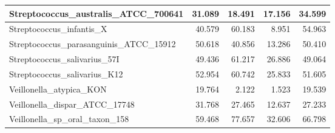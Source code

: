 \documentclass[12pt,a4paper]{article}
\begin{document}
\begin{table}[ht]
\begin{center}
\begin{tabular}{|l*{4}{|r}|}
Streptococcus\_australis\_ATCC\_700641 & 31.089 & 18.491 & 17.156 & 34.599 \\ \hline
Streptococcus\_infantis\_X & 40.579 & 60.183 & 8.951 & 54.963 \\ \hline
Streptococcus\_parasanguinis\_ATCC\_15912 & 50.618 & 40.856 & 13.286 & 50.410 \\ \hline
Streptococcus\_salivarius\_57I & 49.436 & 61.217 & 26.886 & 49.064 \\ \hline
Streptococcus\_salivarius\_K12 & 52.954 & 60.742 & 25.833 & 51.605 \\ \hline
Veillonella\_atypica\_KON & 19.764 & 2.122 & 1.523 & 19.539 \\ \hline
Veillonella\_dispar\_ATCC\_17748 & 31.768 & 27.465 & 12.637 & 27.233 \\ \hline
Veillonella\_sp\_oral\_taxon\_158 & 59.468 & 77.657 & 32.606 & 66.798 \\ \hline
\end{tabular}
\end{center}
\end{table}
\end{document}
